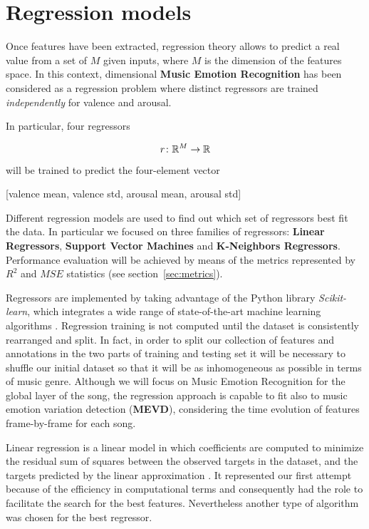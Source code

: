 \section{Regression models}\label{sec:regression}

Once features have been extracted, regression theory allows to predict a real value from a set of $M$ given inputs, where $M$ is the dimension of the features space.
In this context, dimensional \textbf{Music Emotion Recognition} has been considered as a regression problem where distinct regressors are trained \textit{independently} for valence and arousal. 

In particular, four regressors

\[
	r \colon \mathbb{R}^{M} \to \mathbb{R}
\]

will be trained to predict the four-element vector

\begin{center}
	[valence mean, valence std, arousal mean, arousal std]
\end{center}

Different regression models are used to find out which set of regressors best fit the data. In particular we focused on three families of regressors: \textbf{Linear Regressors}, \textbf{Support Vector Machines} and \textbf{K-Neighbors Regressors}. Performance evaluation will be achieved by means of the metrics represented by $R^2$ and $MSE$ statistics (see section~\ref{sec:metrics}).

Regressors are implemented by taking advantage of the Python library \textit{Scikit-learn}, which integrates a wide range of state-of-the-art machine learning algorithms \cite{scikit-learn}.
Regression training is not computed until the dataset is consistently rearranged and split. In fact, in order to split our collection of features and annotations in the two parts of training and testing set it will be necessary to shuffle our initial dataset so that it will be as inhomogeneous as possible in terms of music genre. 
Although we will focus on Music Emotion Recognition for the global layer of the song, the regression approach is capable to fit also to music emotion variation detection (\textbf{MEVD}), considering the time evolution of features frame-by-frame for each song.

Linear regression is a linear model in which coefficients are computed to minimize the residual sum of squares between the observed targets in the dataset, and the targets predicted by the linear approximation \cite{scikit-learn}.
It represented our first attempt because of the efficiency in computational terms and consequently had the role to facilitate the search for the best features. Nevertheless another type of algorithm was chosen for the best regressor. 


